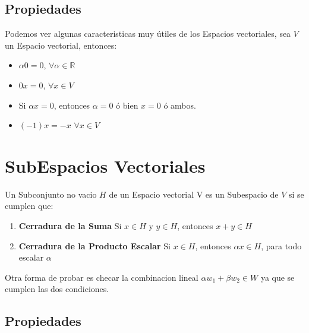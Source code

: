 \documentclass[12pt]{report}                                %
\begin{document}
        \subsection{Propiedades}
        Podemos ver algunas caracteristicas muy útiles de los Espacios vectoriales, sea $V$ 
        un Espacio vectorial, entonces:
        \begin{itemize}
            \item $\alpha 0 = 0 $, $\forall \alpha \in \mathbb{R}$\\
            \item $0x = 0$, $\forall x \in V$
            \item Si $\alpha x = 0$, entonces $\alpha = 0$ ó bien $x = 0$ ó ambos.
            \item $(-1)x = -x$ $\forall x \in V$
        \end{itemize}


    \clearpage
    \section{SubEspacios Vectoriales}    
    
        Un Subconjunto no vacio $H$ de un Espacio vectorial V
        es un Subespacio de $V$ si se cumplen que:

        \begin{enumerate}
            \item \textbf{Cerradura de la Suma}
            Si $x \in H$ y $y \in H$, entonces $x + y \in H$

            \item \textbf{Cerradura de la Producto Escalar}
            Si $x \in H$, entonces $\alpha x \in H$, para
            todo escalar $\alpha$
        \end{enumerate}

        Otra forma de probar es checar la combinacion lineal $\alpha w_1 + \beta w_2 \in W$
        ya que se cumplen las dos condiciones.

        \subsection{Propiedades}
\end{document}
